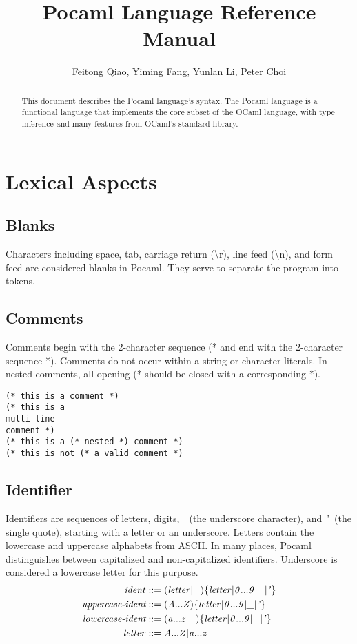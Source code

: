 \documentclass[journal]{IEEEtran}
\begin{document}
\title{Pocaml Language Reference Manual}

\author{Feitong Qiao, Yiming Fang,
        Yunlan Li, Peter Choi
        }
        
\maketitle

\begin{abstract}
This document describes the Pocaml language's syntax.
The Pocaml language is a functional language that implements the core subset of the OCaml language, with type inference and many features from OCaml's standard library.
\end{abstract}

\section{Lexical Aspects}
\subsection{Blanks} 
Characters including space, tab, carriage return (\textbackslash r), line feed (\textbackslash n), and form feed are considered blanks in Pocaml. They serve to separate the program into tokens.

\subsection{Comments} 
Comments begin with the 2-character sequence (* and end with the 2-character sequence *). Comments do not occur within a string or character literals. In nested comments, all opening (* should be closed with a corresponding *).
\begin{verbatim}
(* this is a comment *)
(* this is a
multi-line
comment *)
(* this is a (* nested *) comment *)
(* this is not (* a valid comment *)
\end{verbatim}

\subsection{Identifier}
Identifiers are sequences of letters, digits, $\_$ (the underscore character), and ' (the single quote), starting with a letter or an underscore. Letters contain the lowercase and uppercase alphabets from ASCII. In many places, Pocaml distinguishes between capitalized and non-capitalized identifiers. Underscore is considered a lowercase letter for this purpose.
\begin{align*}
\textnormal{\textit{ident}}
& ::= (\textnormal{\textit{letter}} | \textnormal{\textit{\_}}) \{ \textnormal{\textit{letter}} | \textnormal{\textit{0}}...\textnormal{\textit{9}} | \textnormal{\textit{\_}} | \textnormal{\textit{'}} \} \\
\textit{uppercase-ident}
& ::= (\textnormal{\textit{A}}...\textnormal{\textit{Z}}) \{ \textnormal{\textit{letter}} | \textnormal{\textit{0}}...\textnormal{\textit{9}} | \textnormal{\textit{\_}} | \textnormal{\textit{'}}\} \\
\textit{lowercase-ident}
& ::= (\textnormal{\textit{a}}...\textnormal{\textit{z}} | \textnormal{\textit{\_}}) \{ \textnormal{\textit{letter}} | \textnormal{\textit{0}}...\textnormal{\textit{9}} | \textnormal{\textit{\_}} | \textnormal{\textit{'}}\} \\
\textnormal{\textit{letter}}
& ::= \textnormal{\textit{A}}...\textnormal{\textit{Z}} | \textnormal{\textit{a}}...\textnormal{\textit{z}}
\end{align*}
\end{document}
